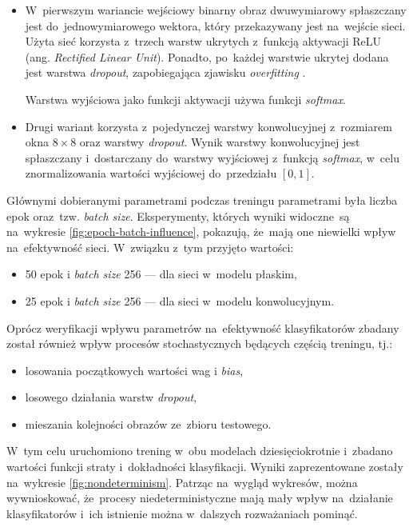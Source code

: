 \documentclass[11pt,a4paper]{article}
\begin{document}
\begin{itemize}
    \item W~pierwszym wariancie wejściowy binarny obraz dwuwymiarowy spłaszczany jest do~jednowymiarowego wektora, który przekazywany jest na~wejście sieci.
    Użyta sieć korzysta z~trzech warstw ukrytych z~funkcją aktywacji ReLU (ang. \emph{Rectified Linear Unit}).
    Ponadto, po~każdej warstwie ukrytej dodana jest warstwa \emph{dropout}, zapobiegająca zjawisku \emph{overfitting} \cite{srivastava2014}.

    Warstwa wyjściowa jako funkcji aktywacji używa funkcji \emph{softmax}.
    \item Drugi wariant korzysta z~pojedynczej warstwy konwolucyjnej z~rozmiarem okna $8 \times 8$ oraz warstwy \emph{dropout}.
    Wynik warstwy konwolucyjnej jest spłaszczany i~dostarczany do~warstwy wyjściowej z~funkcją \emph{softmax}, w~celu znormalizowania wartości wyjściowej do~przedziału $[0,1]$.
\end{itemize}

Głównymi dobieranymi parametrami podczas treningu parametrami była liczba epok oraz~tzw. \emph{batch size}.
Eksperymenty, których wyniki widoczne~są na~wykresie \ref{fig:epoch-batch-influence}, pokazują, że~mają one niewielki wpływ na~efektywność sieci.
W~związku z~tym przyjęto wartości:
\begin{itemize}
    \item 50 epok i \emph{batch size} 256 --- dla sieci w~modelu płaskim,
    \item 25 epok i \emph{batch size} 256 --- dla sieci w~modelu konwolucyjnym.
\end{itemize}

Oprócz weryfikacji wpływu parametrów na~efektywność klasyfikatorów zbadany został również wpływ procesów stochastycznych będących częścią treningu, tj.:
\begin{itemize}
    \item losowania początkowych wartości wag i \emph{bias},
    \item losowego działania warstw \emph{dropout},
    \item mieszania kolejności obrazów ze~zbioru testowego.
\end{itemize}
W~tym celu uruchomiono trening w~obu modelach dziesięciokrotnie i~zbadano wartości funkcji straty i~dokładności klasyfikacji.
Wyniki zaprezentowane zostały na~wykresie \ref{fig:nondeterminism}.
Patrząc na~wygląd wykresów, można wywnioskować, że~procesy niedeterministyczne mają mały wpływ na~działanie klasyfikatorów i~ich istnienie można w~dalszych rozważaniach pominąć.
\end{document}
